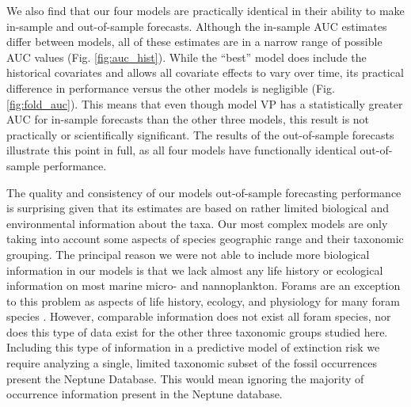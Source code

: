 \documentclass[12pt,letterpaper]{article}
\begin{document}
\begin{refsection}

We also find that our four models are practically identical in their ability to make in-sample and out-of-sample forecasts. Although the in-sample AUC estimates differ between models, all of these estimates are in a narrow range of possible AUC values (Fig. \ref{fig:auc_hist}). While the ``best'' model does include the historical covariates and allows all covariate effects to vary over time, its practical difference in performance versus the other models is negligible (Fig. \ref{fig:fold_auc}). This means that even though model VP has a statistically greater AUC for in-sample forecasts than the other three models, this result is not practically or scientifically significant. The results of the out-of-sample forecasts illustrate this point in full, as all four models have functionally identical out-of-sample performance.


The quality and consistency of our models out-of-sample forecasting performance is surprising given that its estimates are based on rather limited biological and environmental information about the taxa. Our most complex models are only taking into account some aspects of species geographic range and their taxonomic grouping. The principal reason we were not able to include more biological information in our models is that we lack almost any life history or ecological information on most marine micro- and nannoplankton. Forams are an exception to this problem as aspects of life history, ecology, and physiology for many foram species \citep{Ezard2011}. However, comparable information does not exist all foram species, nor does this type of data exist for the other three taxonomic groups studied here. Including this type of information in a predictive model of extinction risk we require analyzing a single, limited taxonomic subset of the fossil occurrences present the Neptune Database. This would mean ignoring the majority of occurrence information present in the Neptune database.


\end{refsection}
\end{document}
